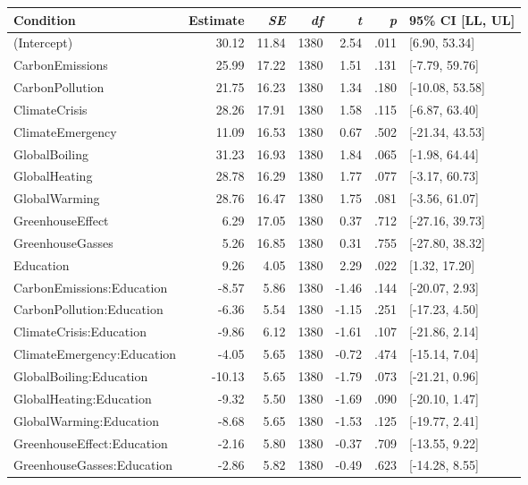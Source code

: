 \begin{table}[ht]
\centering
\begin{tabular}{lrrrrrl}
  \hline
Condition & Estimate & \textit{SE} & \textit{df} & \textit{t} & \textit{p} & 95\% CI [LL, UL] \\ 
  \hline
(Intercept) & 30.12 & 11.84 & 1380 & 2.54 & .011 & [6.90, 53.34] \\ 
  CarbonEmissions & 25.99 & 17.22 & 1380 & 1.51 & .131 & [-7.79, 59.76] \\ 
  CarbonPollution & 21.75 & 16.23 & 1380 & 1.34 & .180 & [-10.08, 53.58] \\ 
  ClimateCrisis & 28.26 & 17.91 & 1380 & 1.58 & .115 & [-6.87, 63.40] \\ 
  ClimateEmergency & 11.09 & 16.53 & 1380 & 0.67 & .502 & [-21.34, 43.53] \\ 
  GlobalBoiling & 31.23 & 16.93 & 1380 & 1.84 & .065 & [-1.98, 64.44] \\ 
  GlobalHeating & 28.78 & 16.29 & 1380 & 1.77 & .077 & [-3.17, 60.73] \\ 
  GlobalWarming & 28.76 & 16.47 & 1380 & 1.75 & .081 & [-3.56, 61.07] \\ 
  GreenhouseEffect & 6.29 & 17.05 & 1380 & 0.37 & .712 & [-27.16, 39.73] \\ 
  GreenhouseGasses & 5.26 & 16.85 & 1380 & 0.31 & .755 & [-27.80, 38.32] \\ 
  Education & 9.26 & 4.05 & 1380 & 2.29 & .022 & [1.32, 17.20] \\ 
  CarbonEmissions:Education & -8.57 & 5.86 & 1380 & -1.46 & .144 & [-20.07, 2.93] \\ 
  CarbonPollution:Education & -6.36 & 5.54 & 1380 & -1.15 & .251 & [-17.23, 4.50] \\ 
  ClimateCrisis:Education & -9.86 & 6.12 & 1380 & -1.61 & .107 & [-21.86, 2.14] \\ 
  ClimateEmergency:Education & -4.05 & 5.65 & 1380 & -0.72 & .474 & [-15.14, 7.04] \\ 
  GlobalBoiling:Education & -10.13 & 5.65 & 1380 & -1.79 & .073 & [-21.21, 0.96] \\ 
  GlobalHeating:Education & -9.32 & 5.50 & 1380 & -1.69 & .090 & [-20.10, 1.47] \\ 
  GlobalWarming:Education & -8.68 & 5.65 & 1380 & -1.53 & .125 & [-19.77, 2.41] \\ 
  GreenhouseEffect:Education & -2.16 & 5.80 & 1380 & -0.37 & .709 & [-13.55, 9.22] \\ 
  GreenhouseGasses:Education & -2.86 & 5.82 & 1380 & -0.49 & .623 & [-14.28, 8.55] \\ 
   \hline
\end{tabular}
\end{table}
